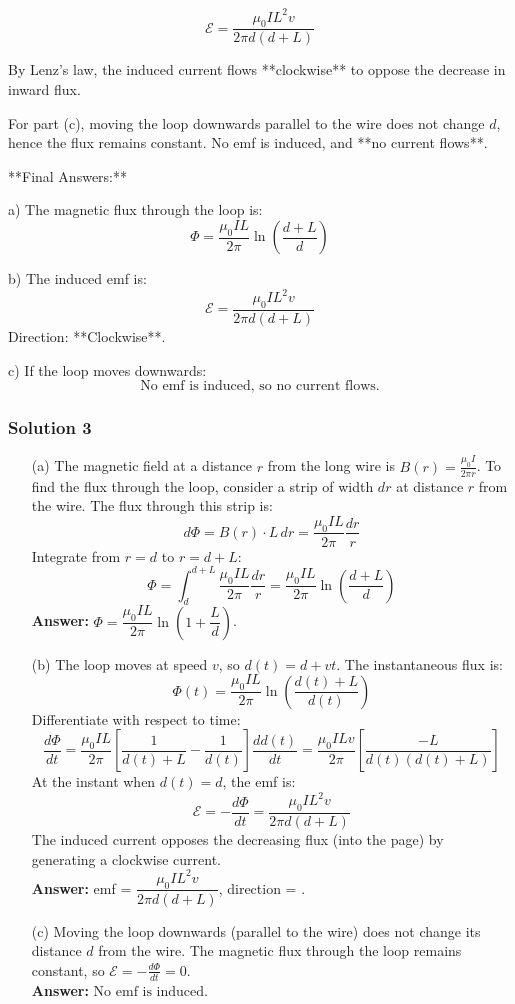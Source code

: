 \documentclass{article}
\begin{document}
\[
\mathcal{E} = \frac{\mu_0 I L^2 v}{2\pi d(d + L)}
\]

By Lenz's law, the induced current flows **clockwise** to oppose the decrease in inward flux.

For part (c), moving the loop downwards parallel to the wire does not change \( d \), hence the flux remains constant. No emf is induced, and **no current flows**.

**Final Answers:**

a) The magnetic flux through the loop is:
\[
\boxed{\Phi = \frac{\mu_0 I L}{2\pi} \ln\left(\frac{d + L}{d}\right)}
\]

b) The induced emf is:
\[
\boxed{\mathcal{E} = \frac{\mu_0 I L^2 v}{2\pi d(d + L)}}
\]
Direction: **Clockwise**.

c) If the loop moves downwards:
\[
\boxed{\text{No emf is induced, so no current flows.}}
\]

\subsubsection{Solution 3}

\begin{enumerate}
    \item[(a)] The magnetic field at a distance $r$ from the long wire is $B(r) = \frac{\mu_0 I}{2\pi r}$. To find the flux through the loop, consider a strip of width $dr$ at distance $r$ from the wire. The flux through this strip is:
    \[
    d\Phi = B(r) \cdot L \, dr = \frac{\mu_0 I L}{2\pi} \frac{dr}{r}
    \]
    Integrate from $r = d$ to $r = d + L$:
    \[
    \Phi = \int_{d}^{d + L} \frac{\mu_0 I L}{2\pi} \frac{dr}{r} = \frac{\mu_0 I L}{2\pi} \ln\left(\frac{d + L}{d}\right)
    \]
    \textbf{Answer:} $\boxed{\Phi = \dfrac{\mu_0 I L}{2\pi} \ln\left(1 + \dfrac{L}{d}\right)}$.
    
    \item[(b)] The loop moves at speed $v$, so $d(t) = d + vt$. The instantaneous flux is:
    \[
    \Phi(t) = \frac{\mu_0 I L}{2\pi} \ln\left(\frac{d(t) + L}{d(t)}\right)
    \]
    Differentiate with respect to time:
    \[
    \frac{d\Phi}{dt} = \frac{\mu_0 I L}{2\pi} \left[\frac{1}{d(t) + L} - \frac{1}{d(t)}\right] \frac{dd(t)}{dt} = \frac{\mu_0 I L v}{2\pi} \left[\frac{-L}{d(t)(d(t) + L)}\right]
    \]
    At the instant when $d(t) = d$, the emf is:
    \[
    \mathcal{E} = -\frac{d\Phi}{dt} = \frac{\mu_0 I L^2 v}{2\pi d(d + L)}
    \]
    The induced current opposes the decreasing flux (into the page) by generating a clockwise current. \\
    \textbf{Answer:} emf = $\boxed{\dfrac{\mu_0 I L^2 v}{2\pi d(d + L)}}$, direction = .
    
    \item[(c)] Moving the loop downwards (parallel to the wire) does not change its distance $d$ from the wire. The magnetic flux through the loop remains constant, so $\mathcal{E} = -\frac{d\Phi}{dt} = 0$. \\
    \textbf{Answer:} $\boxed{\text{No emf is induced.}}$
\end{enumerate}
\end{document}
